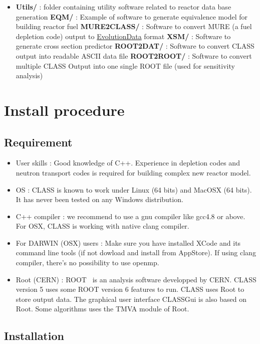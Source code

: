 \begin{itemize}
\item \textbf{Utils/} : folder containing utility software related to reactor data base generation
\subitem \textbf{EQM/} : Example of software to generate equivalence model for building reactor fuel
\subitem \textbf{MURE2CLASS/} : Software to convert MURE (a fuel depletion code)  output to \hyperref[sec:EvolutionData]{EvolutionData} format
\subitem \textbf{XSM/} : Software to generate cross section predictor
\subitem \textbf{ROOT2DAT/} : Software to convert CLASS output into readable ASCII data file
\subitem \textbf{ROOT2ROOT/} : Software to convert multiple CLASS Output into one single ROOT file (used for sensitivity analysis)
 
\end{itemize}

\chapter{Install procedure}

\section{Requirement}

\begin{itemize}
\item User skills : Good knowledge of C++. Experience in depletion codes and neutron transport codes is required for building complex new reactor model.
\item OS : CLASS is known to work under Linux (64  bits) and MacOSX (64 bits). It  has never been tested on any Windows distribution.
\item C++ compiler :  we recommend to use a gnu compiler like gcc4.8 or above. For OSX, CLASS is working with native clang compiler.
\item For DARWIN (OSX) users : 
Make sure you have installed XCode and its command line tools (if not dowload and install from AppStore). If using clang compiler, there's no possibility to use openmp. 
\item Root (CERN) :  
ROOT~\cite{Brun_1997} is an analysis software developped by CERN. CLASS version 5 uses some ROOT version 6 features to run. CLASS uses Root to store output data. The graphical user interface CLASSGui is also based on Root. Some algorithms uses the TMVA module of Root. 
\end{itemize}

\section{Installation}

